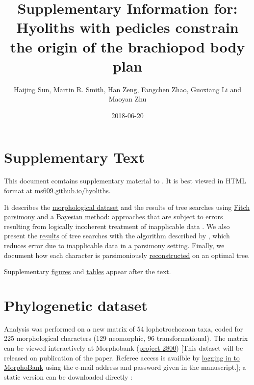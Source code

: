 \documentclass[openany]{book}
\title{Supplementary Information for: \newline\newline Hyoliths with pedicles
constrain the origin of the brachiopod body plan}
\author{Haijing Sun, Martin R. Smith, Han Zeng, Fangchen Zhao, Guoxiang Li and
Maoyan Zhu}
\date{2018-06-20}
\begin{document}
\maketitle

{
\setcounter{tocdepth}{1}
\tableofcontents
}
\chapter*{Supplementary Text}\label{supplementary-text}

This document comtains supplementary material to
\citet{Sun2018Hyolithswith}. It is best viewed in HTML format at
\href{https://ms609.github.io/hyoliths/}{ms609.github.io/hyoliths}.

It describes the \protect\hyperlink{dataset}{morphological dataset} and
the results of tree searches using \protect\hyperlink{fitch}{Fitch
parsimony} and a \protect\hyperlink{bayesian}{Bayesian method}:
approaches that are subject to errors resulting from logically
incoherent treatment of inapplicable data \citep{Maddison1993}. We also
present the \protect\hyperlink{treesearch}{results} of tree searches
with the algorithm described by \citet{Brazeau2018}, which reduces error
due to inapplicable data in a parsimony setting. Finally, we document
how each character is parsimoniously
\protect\hyperlink{reconstructions}{reconstructed} on an optimal tree.

Supplementary \protect\hyperlink{figures}{figures} and
\protect\hyperlink{table}{tables} appear after the text.







\hypertarget{dataset}{\chapter{Phylogenetic dataset}\label{dataset}}

Analysis was performed on a new matrix of 54 lophotrochozoan taxa, coded
for 225 morphological characters (129 neomorphic, 96 transformational).
The matrix can be viewed interactively at Morphobank
(\href{https://morphobank.org/permalink/?P2800}{project 2800}) {[}This
dataset will be released on publication of the paper. Referee access is
availble by
\href{https://morphobank.org/index.php/LoginReg/form}{logging in to
MorphoBank} using the e-mail address and password given in the
manuscript.{]}; a static version can be downloaded directly :
\end{document}
